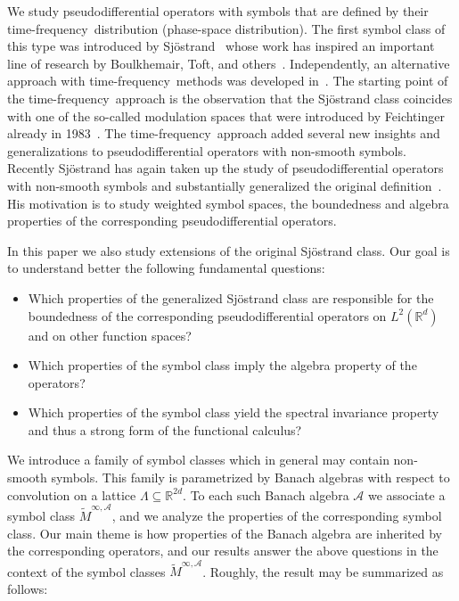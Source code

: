 \documentclass[12pt]{amsart}
\theoremstyle{definition}
\theoremstyle{remark}
\numberwithin{equation}{section}
\newcommand{\tf}{time-frequency}
\newcommand{\modsp}{modulation space}
\newcommand{\psdo}{pseudodifferential operator}
\newcommand{\symbo}{\widetilde M^{\infty, \cA}}
\def\cA{\mathcal{A}}
\def\bR{{\mathbb{R}}}
\def\rd{\bR^d}
\def\rdd{{\bR^{2d}}}
\def\lrd{L^2(\rd)}
\def\cA{\mathcal{A}}
\begin{document}
We study \psdo s with symbols that are defined by their \tf\
distribution (phase-space distribution). The first symbol class  of
this type  was introduced by Sj\"ostrand~\cite{Sjo94,Sjo95} whose work
has inspired an important line of research by Boulkhemair, Toft, and
others~\cite{Bou97,boul99,Toft01,toft04,toft04a,LM06}. Independently, an alternative
approach with \tf\ methods was developed
in~\cite{GH99,GH03,book,grocomp,gro06}. The starting point of the \tf\
approach  is the observation that the Sj\"ostrand class coincides with
one of the so-called \modsp s that were introduced by Feichtinger
already in 1983~\cite{fei83}. %
The \tf\ approach added several new insights and 
generalizations  to \psdo s with
non-smooth symbols. Recently Sj\"ostrand has again  taken up
the study of \psdo s with non-smooth symbols and substantially
generalized the original definition~\cite{sjo07}. His  motivation is to
study weighted symbol spaces, the boundedness and algebra properties
of the corresponding \psdo s. 

In this  paper we  also study  extensions of the original
Sj\"ostrand class. Our goal is to understand better the following
fundamental questions:
\begin{itemize}
\item Which properties of the
generalized Sj\"ostrand class are responsible for the boundedness of
the corresponding \psdo s on $\lrd $ and on other function spaces?
\item Which properties of the symbol class imply the algebra property of the
operators?
\item Which properties of the symbol class  yield the spectral
  invariance property and thus a
strong form of the functional calculus? 
\end{itemize}
 

We introduce a family of symbol classes which in general
may contain non-smooth symbols. This family is parametrized by 
 Banach algebras with respect to convolution
on
a lattice $\Lambda \subseteq \rdd$. To each such Banach algebra $\cA $ we
associate a symbol class $\symbo $,  and we  analyze the
properties of the corresponding symbol class. Our main theme is
how properties of the Banach algebra are inherited  by the
corresponding operators, and our results answer the above questions in
the context of the symbol classes $\symbo $. Roughly, the result may
be summarized as follows: 
\end{document}
